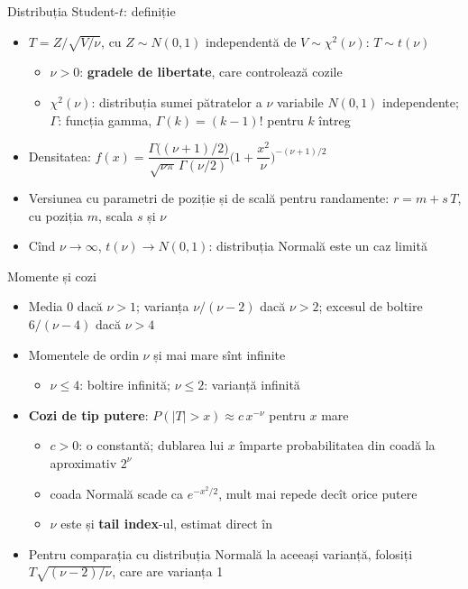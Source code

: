 \begin{frame}{Distribuția Student-$t$: definiție}
\itemsize{\small}
\begin{itemize}
    \item $T = Z/\sqrt{V/\nu}$, cu $Z \sim N(0,1)$ independentă de $V \sim \chi^2(\nu)$: $T \sim t(\nu)$
    \begin{itemize}
        \item $\nu > 0$: \textbf{gradele de libertate}, care controlează cozile
        \item $\chi^2(\nu)$: distribuția sumei pătratelor a $\nu$ variabile $N(0,1)$ independente; $\Gamma$: funcția gamma, $\Gamma(k) = (k-1)!$ pentru $k$ întreg
    \end{itemize}
    \item Densitatea: $f(x) = \dfrac{\Gamma\big((\nu+1)/2\big)}{\sqrt{\nu\pi}\,\Gamma(\nu/2)} \Big(1 + \dfrac{x^2}{\nu}\Big)^{-(\nu+1)/2}$
    \item Versiunea cu parametri de poziție și de scală pentru randamente: $r = m + s\,T$, cu poziția $m$, scala $s$ și $\nu$
    \item Cînd $\nu \to \infty$, $t(\nu) \to N(0,1)$: distribuția Normală este un caz limită
\end{itemize}
\end{frame}

\begin{frame}{Momente și cozi}
\itemsize{\small}
\begin{itemize}
    \item Media $0$ dacă $\nu > 1$; varianța $\nu/(\nu - 2)$ dacă $\nu > 2$; excesul de boltire $6/(\nu - 4)$ dacă $\nu > 4$
    \item Momentele de ordin $\nu$ și mai mare sînt infinite
    \begin{itemize}
        \item $\nu \le 4$: boltire infinită; $\nu \le 2$: varianță infinită
    \end{itemize}
    \item \textbf{Cozi de tip putere}: $P(|T| > x) \approx c\,x^{-\nu}$ pentru $x$ mare
    \begin{itemize}
        \item $c > 0$: o constantă; dublarea lui $x$ împarte probabilitatea din coadă la aproximativ $2^{\nu}$
        \item coada Normală scade ca $e^{-x^2/2}$, mult mai repede decît orice putere
        \item $\nu$ este și \textbf{tail index}-ul, estimat direct în 
    \end{itemize}
    \item Pentru comparația cu distribuția Normală la aceeași varianță, folosiți $T\sqrt{(\nu - 2)/\nu}$, care are varianța 1
\end{itemize}
\end{frame}

